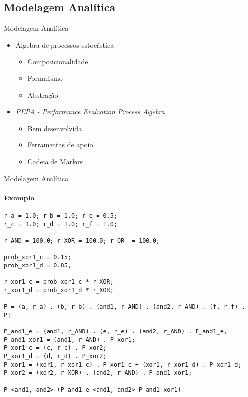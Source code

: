 \documentclass[xcolor=x11names,compress]{beamer}
\renewcommand{\(}{\begin{columns}}
\renewcommand{\)}{\end{columns}}
\newcommand{\<}[1]{\begin{column}{#1}}
\renewcommand{\>}{\end{column}}
\begin{document}
    \subsection{Modelagem Analítica}
        \begin{frame}{Modelagem Analítica}
            \begin{itemize}
                \item<1-> Álgebra de processos estocástica
                    \begin{itemize}
                        \item<2-> Composicionalidade
                        \item<2-> Formalismo
                        \item<2-> Abstração
                    \end{itemize}
                \item<3-> \emph{PEPA - Performance Evaluation Process Algebra}
                    \begin{itemize}
                        \item<4-> Bem desenvolvida
                        \item<4-> Ferramentas de apoio
                        \item<4-> Cadeia de Markov
                    \end{itemize}
            \end{itemize}
        \end{frame}

\begin{frame}[fragile]{Modelagem Analítica}
    \framesubtitle{Exemplo}
    \begin{lstlisting}[basicstyle=\tiny]
r_a = 1.0; r_b = 1.0; r_e = 0.5;
r_c = 1.0; r_d = 1.0; r_f = 1.0;

r_AND = 100.0; r_XOR = 100.0; r_OR  = 100.0;

prob_xor1_c = 0.15;
prob_xor1_d = 0.85;

r_xor1_c = prob_xor1_c * r_XOR;
r_xor1_d = prob_xor1_d * r_XOR;

P = (a, r_a) . (b, r_b) . (and1, r_AND) . (and2, r_AND) . (f, r_f) . P;

P_and1_e = (and1, r_AND) . (e, r_e) . (and2, r_AND) . P_and1_e;
P_and1_xor1 = (and1, r_AND) . P_xor1;
P_xor1_c = (c, r_c) . P_xor2;
P_xor1_d = (d, r_d) . P_xor2;
P_xor1 = (xor1, r_xor1_c) . P_xor1_c + (xor1, r_xor1_d) . P_xor1_d;
P_xor2 = (xor2, r_XOR) . (and2, r_AND) . P_and1_xor1;

P <and1, and2> (P_and1_e <and1, and2> P_and1_xor1)
    \end{lstlisting}
\end{frame}
\end{document}

